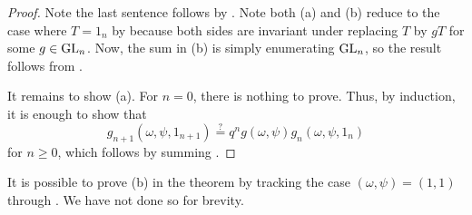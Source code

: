 \begin{proof}
    Note the last sentence follows by . Note both (a) and (b) reduce to the case where $T=1_n$ by  because both sides are invariant under replacing $T$ by $gT$ for some $g\in\mathrm{GL}_n$. Now, the sum in (b) is simply enumerating $\mathrm{GL}_n$, so the result follows from \cite[Proposition~7.1.1]{hach-gf}.

    It remains to show (a). For $n=0$, there is nothing to prove. Thus, by induction, it is enough to show that
    \[g_{n+1}(\omega,\psi,1_{n+1})\stackrel?=q^ng(\omega,\psi)g_n(\omega,\psi,1_n)\]
    for $n\ge0$, which follows by summing .
\end{proof}
\begin{remark}
    It is possible to prove (b) in the theorem by tracking the case $(\omega,\psi)=(1,1)$ through . We have not done so for brevity.
\end{remark}
